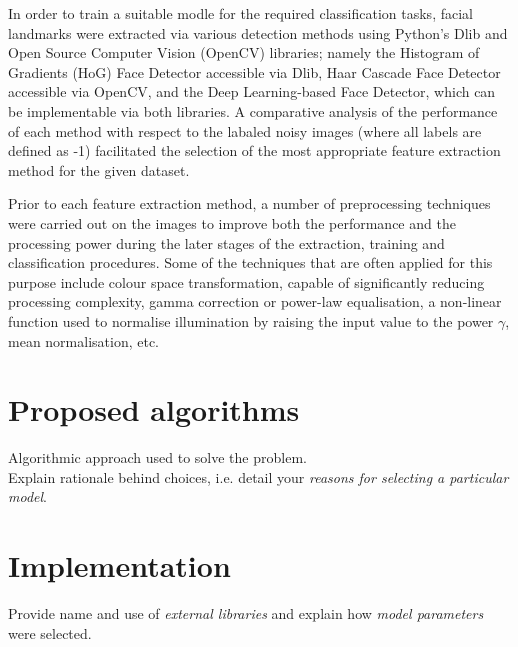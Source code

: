 \documentclass[conference]{IEEEtran}
\begin{document}
In order to train a suitable modle for the required classification tasks, facial landmarks were extracted via various detection methods using Python's Dlib and Open Source Computer Vision (OpenCV) libraries; namely the Histogram of Gradients (HoG) Face Detector accessible via Dlib, Haar Cascade Face Detector accessible via OpenCV, and the Deep Learning-based Face Detector, which can be implementable via both libraries. A comparative analysis of the performance of each method with respect to the labaled noisy images (where all labels are defined as -1) facilitated the selection of the most appropriate feature extraction method for the given dataset.

Prior to each feature extraction method, a number of preprocessing techniques were carried out on the images to improve both the performance and the processing power during the later stages of the extraction, training and classification procedures. Some of the techniques that are often applied for this purpose include colour space transformation, capable of significantly reducing processing complexity, gamma correction or power-law equalisation, a non-linear function used to normalise illumination by raising the input value to the power $\gamma$, mean normalisation, etc.

\section{Proposed algorithms} \label{s-algorithms}

Algorithmic approach used to solve the problem.\\



Explain rationale behind choices, i.e. detail your \textit{reasons for selecting a particular model}.\\


\section{Implementation} \label{s-implement}

Provide name and use of \textit{external libraries} and explain how \textit{model parameters} were selected.\\
\end{document}
